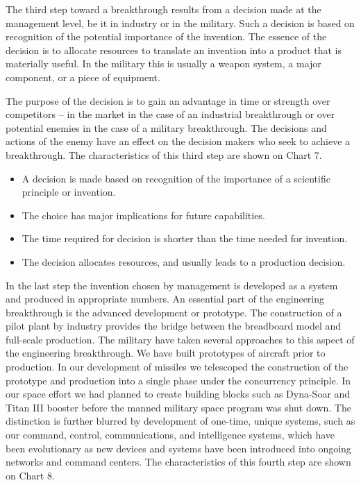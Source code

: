 The third step toward a breakthrough results from a decision made at the management level, be it in industry or in the military. Such a decision is based on recognition of the potential importance of the invention. The essence of the decision is to allocate resources to translate an invention into a product that is materially useful. In the military this is usually a weapon system, a major component, or a piece of equipment.

The purpose of the decision is to gain an advantage in time or strength over competitors -- in the market in the case of an industrial breakthrough or over potential enemies in the case of a military breakthrough. The decisions and actions of the enemy have an effect on the decision makers who seek to achieve a breakthrough. The characteristics of this third step are shown on Chart 7.

\begin{mdframed}[nobreak=true, frametitle={CHART 7: The Management Breakthrough}] 
    \begin{itemize}
        \item A decision is made based on recognition of the importance of a scientific principle or invention.
        \item The choice has major implications for future capabilities.
        \item The time required for decision is shorter than the time needed for invention.
        \item The decision allocates resources, and usually leads to a production decision.
    \end{itemize}
\end{mdframed}

In the last step the invention chosen by management is developed as a system and produced in appropriate numbers. An essential part of the engineering breakthrough is the advanced development or prototype. The construction of a pilot plant by industry provides the bridge between the breadboard model and full-scale production.
The military have taken several approaches to this aspect of the engineering breakthrough. We have built prototypes of aircraft prior to production. In our development of missiles we telescoped the construction of the prototype and production into a single phase under the concurrency principle. In our space effort we had planned to create building blocks such as Dyna-Soar and Titan III booster before the manned military space program was shut down. 
The distinction is further blurred by development of one-time, unique systems, such as our command, control, communications, and intelligence systems, which have been evolutionary as new devices and systems have been introduced into ongoing networks and command centers. The characteristics of this fourth step are shown on Chart 8.


